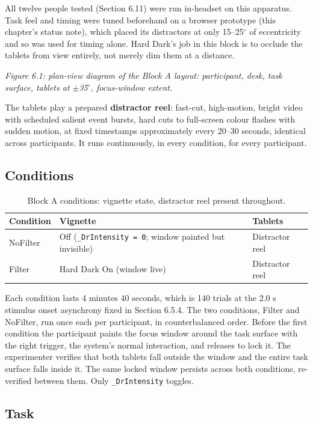 All twelve people tested (Section 6.11) were run in-headset on this apparatus. Task feel and timing
were tuned beforehand on a browser prototype (this chapter's status note), which placed its
distractors at only 15–25$^{\circ}$ of eccentricity and so was used for timing alone. Hard Dark's job in
this block is to occlude the tablets from view entirely, not merely dim them at a distance.

\textit{Figure 6.1: plan-view diagram of the Block A layout: participant, desk, task surface, tablets at
$\pm$35$^{\circ}$, focus-window extent.}

The tablets play a prepared \textbf{distractor reel}: fast-cut, high-motion, bright video with scheduled
salient event bursts, hard cuts to full-screen colour flashes with sudden motion, at fixed
timestamps approximately every 20–30 seconds, identical across participants. It runs continuously, in
every condition, for every participant.

\subsection{Conditions}

\begin{longtable}{p{}|p{}|p{}}
\caption{Block A conditions: vignette state, distractor reel present throughout.}\\
\hline
\textbf{Condition} & \textbf{Vignette} & \textbf{Tablets} \\
\hline
\endhead
\hline
NoFilter & Off (\verb|_DrIntensity = 0|; window painted but invisible) & Distractor reel \\
Filter & Hard Dark On (window live) & Distractor reel \\
\hline
\end{longtable}

Each condition lasts 4 minutes 40 seconds, which is 140 trials at the 2.0 s stimulus onset
asynchrony fixed in Section 6.5.4. The two conditions, Filter and NoFilter, run once each per
participant, in counterbalanced order. Before the first condition the participant paints the focus
window around the task surface with the right trigger, the system's normal interaction, and releases
to lock it. The experimenter verifies that both tablets fall outside the window and the entire task
surface falls inside it. The same locked window persists across both conditions, re-verified between
them. Only \verb|_DrIntensity| toggles.

\subsection{Task}

